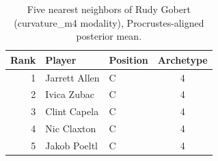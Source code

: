 \begin{table}[htbp]
  \centering\small
  \begin{tabular}{rllc}
    \toprule
    Rank & Player & Position & Archetype \\
    \midrule
    1 & Jarrett Allen & C & 4 \\
    2 & Ivica Zubac & C & 4 \\
    3 & Clint Capela & C & 4 \\
    4 & Nic Claxton & C & 4 \\
    5 & Jakob Poeltl & C & 4 \\
    \bottomrule
  \end{tabular}
  \caption{Five nearest neighbors of Rudy Gobert (curvature_m4 modality), Procrustes-aligned posterior mean.}
  \label{tab:Rudy_Gobert_neighbors_curvature_m4}
\end{table}

